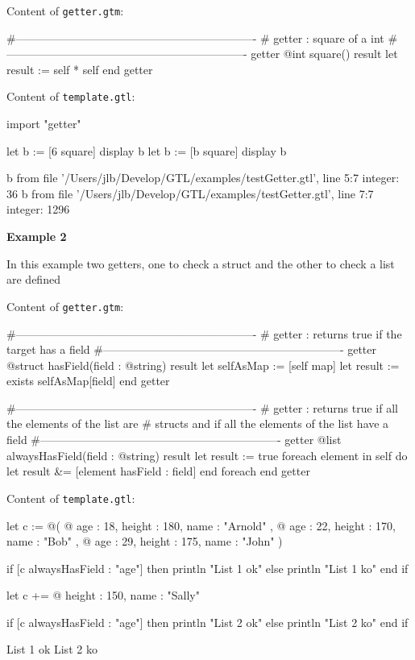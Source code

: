\documentclass[10pt,openright,twosides,final]{memoir}
\newcommand{\gtltype}[1]{{\small\ttfamily #1}}
\newcommand{\examplen}[1]{\vspace{.75em}\noindent\textbf{Example #1}\vspace{0em}}
\begin{document}
\noindent Content of \texttt{\footnotesize getter.gtm}:
\begin{gtl}
#----------------------------------------------------------------
# getter : square of a int
#----------------------------------------------------------------
getter @int square() result
  let result := self * self
end getter
\end{gtl}
\noindent Content of \texttt{\footnotesize template.gtl}:
\begin{gtl}
import "getter"

let b := [6 square]
display b
let b := [b square]
display b
\end{gtl}
\begin{console}
b from file '/Users/jlb/Develop/GTL/examples/testGetter.gtl', line 5:7
    integer: 36
b from file '/Users/jlb/Develop/GTL/examples/testGetter.gtl', line 7:7
    integer: 1296
\end{console}

\examplen{2}

In this example two getters, one to check a \gtltype{struct} and the other to check a \gtltype{list} are defined

\noindent Content of \texttt{\footnotesize getter.gtm}:
\begin{gtl}
#----------------------------------------------------------------
# getter : returns true if the target has a field
#----------------------------------------------------------------
getter @struct hasField(field : @string) result
  let selfAsMap := [self map]
  let result := exists selfAsMap[field]
end getter


#----------------------------------------------------------------
# getter : returns true if all the elements of the list are
# structs and if all the elements of the list have a field
#----------------------------------------------------------------
getter @list alwaysHasField(field : @string) result
  let result := true
  foreach element in self do
    let result &= [element hasField : field]
  end foreach
end getter
\end{gtl}
\noindent Content of \texttt{\footnotesize template.gtl}:
\begin{gtl}
let c := @(
  @{ age : 18, height : 180, name : "Arnold" },
  @{ age : 22, height : 170, name : "Bob"    },
  @{ age : 29, height : 175, name : "John"   }
)

if [c alwaysHasField : "age"] then
  println "List 1 ok"
else
  println "List 1 ko"
end if

let c += @{ height : 150, name : "Sally" }

if [c alwaysHasField : "age"] then
  println "List 2 ok"
else
  println "List 2 ko"
end if
\end{gtl}
\begin{console}
List 1 ok
List 2 ko
\end{console}
\end{document}
